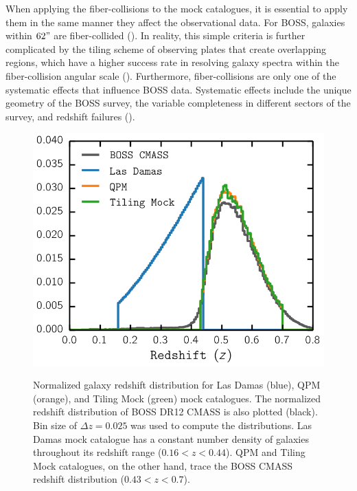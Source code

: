 \documentclass{emulateapj}
\begin{document}
When applying the fiber-collisions to the mock catalogues, it is essential to apply them in the same manner they affect the observational data. For BOSS, galaxies within $62"$ are fiber-collided (\citealt{Anderson:2012aa}). In reality, this simple criteria is further complicated by the tiling scheme of observing plates that create overlapping regions, which have a higher success rate in resolving galaxy spectra within the fiber-collision angular scale (\citealt{Guo:2012aa}). Furthermore, fiber-collisions are only one of the systematic effects that influence BOSS data. Systematic effects include the unique geometry of the BOSS survey, the variable completeness in different sectors of the survey, and redshift failures (\citealt{Anderson:2012aa}). 

\def \cmasscolor{black}
\def \ldgcolor{blue}
\def \qpmcolor{orange}
\def \tmcolor{green}
\begin{figure}
\begin{center}
\includegraphics[scale=0.45]{fcpaper_z_dist.png} \label{fig:zdist}
\caption{Normalized galaxy redshift distribution for Las Damas (\ldgcolor), QPM (\qpmcolor), and Tiling Mock (\tmcolor) mock catalogues. The normalized redshift distribution of BOSS DR12 CMASS is also plotted (\cmasscolor). Bin size of $\Delta z = 0.025$ was used to compute the distributions. Las Damas mock catalogue has a constant number density of galaxies throughout its redshift range ($0.16 < z < 0.44$). QPM and Tiling Mock catalogues, on the other hand, trace the BOSS CMASS redshift distribution ($0.43 < z < 0.7$).}
\end{center}
\end{figure}
\end{document}

